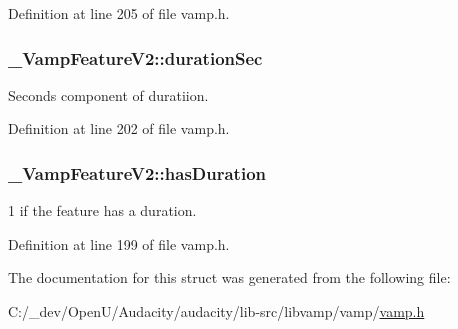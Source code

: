 Definition at line 205 of file vamp.\+h.

\subsubsection[{\texorpdfstring{duration\+Sec}{durationSec}}]{ \+\_\+\+Vamp\+Feature\+V2\+::duration\+Sec}\hypertarget{struct___vamp_feature_v2_abc95aac3a2efdef6ef0b17e7b6bd3daf}{}\label{struct___vamp_feature_v2_abc95aac3a2efdef6ef0b17e7b6bd3daf}
Seconds component of duratiion. 

Definition at line 202 of file vamp.\+h.

\subsubsection[{\texorpdfstring{has\+Duration}{hasDuration}}]{ \+\_\+\+Vamp\+Feature\+V2\+::has\+Duration}\hypertarget{struct___vamp_feature_v2_a44d9c57f1ae197d3fec1a48c650cce81}{}\label{struct___vamp_feature_v2_a44d9c57f1ae197d3fec1a48c650cce81}
1 if the feature has a duration. 

Definition at line 199 of file vamp.\+h.



The documentation for this struct was generated from the following file\+:\begin{DoxyCompactItemize}
\item 
C\+:/\+\_\+dev/\+Open\+U/\+Audacity/audacity/lib-\/src/libvamp/vamp/\hyperlink{vamp_8h}{vamp.\+h}\end{DoxyCompactItemize}
